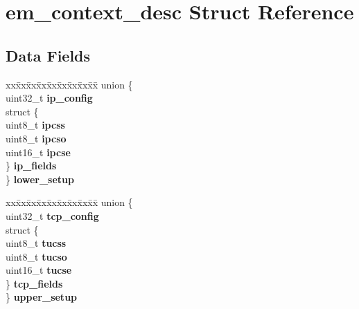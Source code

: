 \hypertarget{structem__context__desc}{}\section{em\+\_\+context\+\_\+desc Struct Reference}
\label{structem__context__desc}
\subsection*{Data Fields}
\begin{DoxyCompactItemize}
\item 
\mbox{\label{structem__context__desc_ac0ab81116b5104021a22683e526ec6e7}} 
\begin{tabbing}
xx\=xx\=xx\=xx\=xx\=xx\=xx\=xx\=xx\=\kill
union \{\\
\>uint32\_t {\bfseries ip\_config}\\
\>struct \{\\
\>\>uint8\_t {\bfseries ipcss}\\
\>\>uint8\_t {\bfseries ipcso}\\
\>\>uint16\_t {\bfseries ipcse}\\
\>\} {\bfseries ip\_fields}\\
\} {\bfseries lower\_setup}\\

\end{tabbing}\item 
\mbox{\label{structem__context__desc_a9fc3e60610dedaf15f92d418c7bcb866}} 
\begin{tabbing}
xx\=xx\=xx\=xx\=xx\=xx\=xx\=xx\=xx\=\kill
union \{\\
\>uint32\_t {\bfseries tcp\_config}\\
\>struct \{\\
\>\>uint8\_t {\bfseries tucss}\\
\>\>uint8\_t {\bfseries tucso}\\
\>\>uint16\_t {\bfseries tucse}\\
\>\} {\bfseries tcp\_fields}\\
\} {\bfseries upper\_setup}\\


\end{tabbing}
\end{DoxyCompactItemize}
